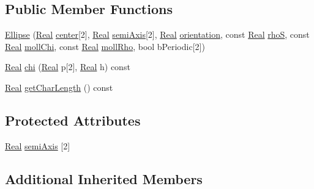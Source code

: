 \subsection*{Public Member Functions}
\begin{DoxyCompactItemize}
\item 
\hyperlink{class_ellipse_a0deee753167fddaf46ee4069f6163d75}{Ellipse} (\hyperlink{_h_d_f5_dumper_8h_a445a5f0e2a34c9d97d69a3c2d1957907}{Real} \hyperlink{class_shape_a865a04fe67fc785b3cbb44806a214248}{center}\mbox{[}2\mbox{]}, \hyperlink{_h_d_f5_dumper_8h_a445a5f0e2a34c9d97d69a3c2d1957907}{Real} \hyperlink{class_ellipse_aa4758f568a38a31bbea0b4b424486a40}{semi\+Axis}\mbox{[}2\mbox{]}, \hyperlink{_h_d_f5_dumper_8h_a445a5f0e2a34c9d97d69a3c2d1957907}{Real} \hyperlink{class_shape_a1778439509ada1f3fa64472610221d19}{orientation}, const \hyperlink{_h_d_f5_dumper_8h_a445a5f0e2a34c9d97d69a3c2d1957907}{Real} \hyperlink{class_shape_a181acdc3063f20a15ba1807f7b6a5d10}{rho\+S}, const \hyperlink{_h_d_f5_dumper_8h_a445a5f0e2a34c9d97d69a3c2d1957907}{Real} \hyperlink{class_shape_ad7d270a8ffc4056d4990424dffdd0488}{moll\+Chi}, const \hyperlink{_h_d_f5_dumper_8h_a445a5f0e2a34c9d97d69a3c2d1957907}{Real} \hyperlink{class_shape_af5aa25175d49bc463fada7b11f2735e1}{moll\+Rho}, bool b\+Periodic\mbox{[}2\mbox{]})
\item 
\hyperlink{_h_d_f5_dumper_8h_a445a5f0e2a34c9d97d69a3c2d1957907}{Real} \hyperlink{class_ellipse_ab4cc2d14593c52c17a78d9d2a7f4ecb9}{chi} (\hyperlink{_h_d_f5_dumper_8h_a445a5f0e2a34c9d97d69a3c2d1957907}{Real} p\mbox{[}2\mbox{]}, \hyperlink{_h_d_f5_dumper_8h_a445a5f0e2a34c9d97d69a3c2d1957907}{Real} h) const 
\item 
\hyperlink{_h_d_f5_dumper_8h_a445a5f0e2a34c9d97d69a3c2d1957907}{Real} \hyperlink{class_ellipse_a51028b0d38b83fc0de8c60c27775ed14}{get\+Char\+Length} () const 
\end{DoxyCompactItemize}
\subsection*{Protected Attributes}
\begin{DoxyCompactItemize}
\item 
\hyperlink{_h_d_f5_dumper_8h_a445a5f0e2a34c9d97d69a3c2d1957907}{Real} \hyperlink{class_ellipse_aa4758f568a38a31bbea0b4b424486a40}{semi\+Axis} \mbox{[}2\mbox{]}
\end{DoxyCompactItemize}
\subsection*{Additional Inherited Members}


